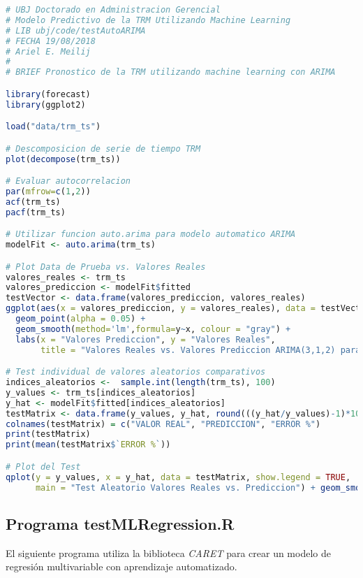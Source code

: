 \begin{lstlisting}[language=R]
# UBJ Doctorado en Administracion Gerencial
# Modelo Predictivo de la TRM Utilizando Machine Learning
# LIB ubj/code/testAutoARIMA 
# FECHA 19/08/2018
# Ariel E. Meilij
#
# BRIEF Pronostico de la TRM utilizando machine learning con ARIMA

library(forecast)
library(ggplot2)

load("data/trm_ts")

# Descomposicion de serie de tiempo TRM
plot(decompose(trm_ts))

# Evaluar autocorrelacion
par(mfrow=c(1,2))
acf(trm_ts)
pacf(trm_ts)

# Utilizar funcion auto.arima para modelo automatico ARIMA
modelFit <- auto.arima(trm_ts)

# Plot Data de Prueba vs. Valores Reales
valores_reales <- trm_ts
valores_prediccion <- modelFit$fitted
testVector <- data.frame(valores_prediccion, valores_reales)
ggplot(aes(x = valores_prediccion, y = valores_reales), data = testVector) + 
  geom_point(alpha = 0.05) + 
  geom_smooth(method='lm',formula=y~x, colour = "gray") +
  labs(x = "Valores Prediccion", y = "Valores Reales", 
       title = "Valores Reales vs. Valores Prediccion ARIMA(3,1,2) para TRM 2010-2017 ")

# Test individual de valores aleatorios comparativos
indices_aleatorios <-  sample.int(length(trm_ts), 100)
y_values <- trm_ts[indices_aleatorios]
y_hat <- modelFit$fitted[indices_aleatorios]
testMatrix <- data.frame(y_values, y_hat, round(((y_hat/y_values)-1)*100,1))
colnames(testMatrix) = c("VALOR REAL", "PREDICCION", "ERROR %")
print(testMatrix)
print(mean(testMatrix$`ERROR %`))

# Plot del Test
qplot(y = y_values, x = y_hat, data = testMatrix, show.legend = TRUE,
      main = "Test Aleatorio Valores Reales vs. Prediccion") + geom_smooth(formula = y~x) 
\end{lstlisting}

\subsection{Programa testMLRegression.R}
El siguiente programa utiliza la biblioteca \emph{CARET} para crear un modelo de regresión multivariable con aprendizaje automatizado.

